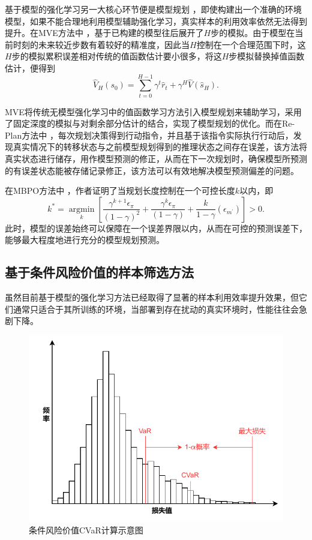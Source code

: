 基于模型的强化学习另一大核心环节便是模型规划 \cite{walsh2010integrating}，即使构建出一个准确的环境模型，如果不能合理地利用模型辅助强化学习，真实样本的利用效率依然无法得到提升。在MVE方法\cite{feinberg2018model}中 ，基于已构建的模型往后展开了$H$步的模拟。由于模型在当前时刻的未来较近步数有着较好的精准度，因此当$H$控制在一个合理范围下时，这$H$步的模拟累积误差相对传统的值函数估计要小很多，将这$H$步模拟替换掉值函数估计，便得到
\begin{equation}
    \widehat{V}_{H}\left(s_{0}\right)=\sum_{t=0}^{H-1} \gamma^{t} \hat{r}_{t}+\gamma^{H} \widehat{V}\left(\hat{s}_{H}\right).
\end{equation}

MVE将传统无模型强化学习中的值函数学习方法引入模型规划来辅助学习，采用了固定深度的模拟与对剩余部分估计的结合，实现了模型规划的优化。而在Re-Plan方法中 \cite{williams2017information}，每次规划决策得到行动指令，并且基于该指令实际执行行动后，发现真实情况下的转移状态与之前模型规划得到的推理状态之间存在误差，该方法将真实状态进行储存，用作模型预测的修正，从而在下一次规划时，确保模型所预测的有误差状态能被存储记录修正，该方法可以有效地解决模型预测偏差的问题。

在MBPO方法中 \cite{janner2019trust}，作者证明了当规划长度控制在一个可控长度$k$以内，即
\begin{equation}
k^{*}=\underset{k}{\operatorname{argmin}}\left[\frac{\gamma^{k+1} \epsilon_{\pi}}{(1-\gamma)^{2}}+\frac{\gamma^{k} \epsilon_{\pi}}{(1-\gamma)}+\frac{k}{1-\gamma}\left(\epsilon_{m^{\prime}}\right)\right]>0.
\end{equation}
此时，模型的误差始终可以保障在一个误差界限以内，从而在可控的预测误差下，能够最大程度地进行充分的模型规划预测。

\subsection{基于条件风险价值的样本筛选方法}

虽然目前基于模型的强化学习方法已经取得了显著的样本利用效率提升效果，但它们通常只适合于其所训练的环境，当部署到存在扰动的真实环境时，性能往往会急剧下降。

\begin{figure}
  \centering
  \includegraphics[width=\linewidth]{figures/CVaR.pdf}
  \caption{条件风险价值CVaR计算示意图}
  \label{fig:cvar}
\end{figure}

